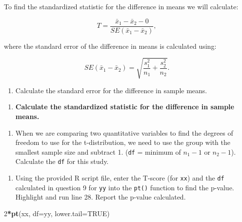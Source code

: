 \documentclass[
]{report}
\newenvironment{Shaded}{\begin{snugshade}}{\end{snugshade}}
\newcommand{\AttributeTok}[1]{\textcolor[rgb]{0.13,0.29,0.53}{#1}}
\newcommand{\ConstantTok}[1]{\textcolor[rgb]{0.56,0.35,0.01}{#1}}
\newcommand{\DecValTok}[1]{\textcolor[rgb]{0.00,0.00,0.81}{#1}}
\newcommand{\FunctionTok}[1]{\textcolor[rgb]{0.13,0.29,0.53}{\textbf{#1}}}
\newcommand{\NormalTok}[1]{#1}
\newcommand{\SpecialCharTok}[1]{\textcolor[rgb]{0.81,0.36,0.00}{\textbf{#1}}}
\providecommand{\tightlist}{%
  \setlength{\itemsep}{0pt}\setlength{\parskip}{0pt}}
\begin{document}
To find the standardized statistic for the difference in means we will calculate:

\[T = \frac{\bar{x}_1-\bar{x}_2 -0}{SE(\bar{x}_1-\bar{x}_2)},\]

where the standard error of the difference in means is calculated using:

\[SE(\bar{x}_1 -\bar{x}_2)=\sqrt{\frac{s_1^2}{n_1}+\frac{s_2^2}{n_2}}.\]

\begin{enumerate}
\def\labelenumi{\arabic{enumi}.}
\setcounter{enumi}{6}
\tightlist
\item
  Calculate the standard error for the difference in sample means.
\end{enumerate}

\vspace{0.5in}

\begin{enumerate}
\def\labelenumi{\arabic{enumi}.}
\setcounter{enumi}{7}
\tightlist
\item
  \textbf{Calculate the standardized statistic for the difference in sample means.}
\end{enumerate}

\vspace{0.5in}

\begin{enumerate}
\def\labelenumi{\arabic{enumi}.}
\setcounter{enumi}{8}
\tightlist
\item
  When we are comparing two quantitative variables to find the degrees of freedom to use for the t-distribution, we need to use the group with the smallest sample size and subtract 1. (\texttt{df} = minimum of \(n_1 - 1\) or \(n_2 - 1\)). Calculate the \texttt{df} for this study.
\end{enumerate}

\vspace{0.2in}

\begin{enumerate}
\def\labelenumi{\arabic{enumi}.}
\setcounter{enumi}{9}
\tightlist
\item
  Using the provided R script file, enter the T-score (for \texttt{xx}) and the \texttt{df} calculated in question 9 for \texttt{yy} into the \texttt{pt()} function to find the p-value. Highlight and run line 28. Report the p-value calculated.
\end{enumerate}

\begin{Shaded}
\begin{Highlighting}[]
\DecValTok{2}\SpecialCharTok{*}\FunctionTok{pt}\NormalTok{(xx, }\AttributeTok{df=}\NormalTok{yy, }\AttributeTok{lower.tail=}\ConstantTok{TRUE}\NormalTok{)}
\end{Highlighting}
\end{Shaded}
\end{document}
